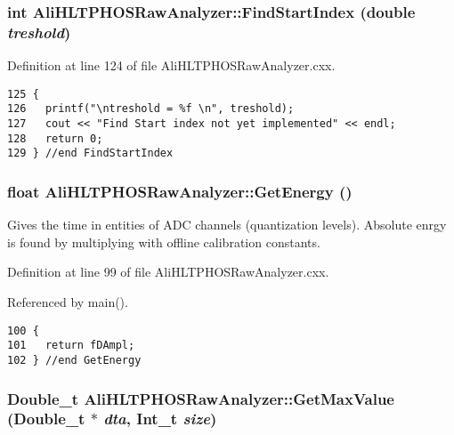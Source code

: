 \subsubsection{\setlength{\rightskip}{0pt plus 5cm}int Ali\-HLTPHOSRaw\-Analyzer::Find\-Start\-Index (double {\em treshold})\hspace{0.3cm}{\tt  [inherited]}}\label{classAliHLTPHOSRawAnalyzer_AliHLTPHOSRawAnalyzerPeakFindera9}




Definition at line 124 of file Ali\-HLTPHOSRaw\-Analyzer.cxx.

\footnotesize\begin{verbatim}125 {
126   printf("\ntreshold = %f \n", treshold);
127   cout << "Find Start index not yet implemented" << endl;
128   return 0;
129 } //end FindStartIndex
\end{verbatim}\normalsize 


\subsubsection{\setlength{\rightskip}{0pt plus 5cm}float Ali\-HLTPHOSRaw\-Analyzer::Get\-Energy ()\hspace{0.3cm}{\tt  [inherited]}}\label{classAliHLTPHOSRawAnalyzer_AliHLTPHOSRawAnalyzerPeakFindera11}


Gives the time in entities of ADC channels (quantization levels). Absolute enrgy is found by multiplying with offline calibration constants. 

Definition at line 99 of file Ali\-HLTPHOSRaw\-Analyzer.cxx.

Referenced by main().

\footnotesize\begin{verbatim}100 {
101   return fDAmpl;
102 } //end GetEnergy
\end{verbatim}\normalsize 


\subsubsection{\setlength{\rightskip}{0pt plus 5cm}Double\_\-t Ali\-HLTPHOSRaw\-Analyzer::Get\-Max\-Value (Double\_\-t $\ast$ {\em dta}, Int\_\-t {\em size})\hspace{0.3cm}{\tt  [inherited]}}\label{classAliHLTPHOSRawAnalyzer_AliHLTPHOSRawAnalyzerPeakFindera18}




